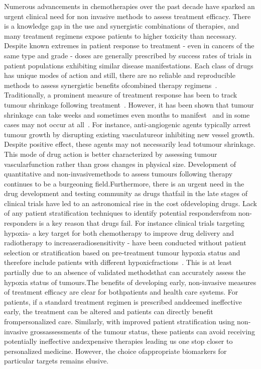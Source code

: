 Numerous advancements in chemotherapies over the past decade have sparked an urgent clinical need for non invasive methods to assess treatment efficacy.
There is a knowledge gap in the use and synergistic combinations of therapies, and many treatment regimens expose patients to higher toxicity than necessary.
Despite known extremes in patient response to treatment - even in cancers of the same type and grade - doses are generally prescribed by success rates of trials in patient populations exhibiting similar disease manifestations.
Each class of drugs has unique modes of action and still, there are no reliable and reproducible methods to assess synergistic benefits ofcombined therapy regimens~\cite{Zhang:2008vi}.
Traditionally, a prominent measure of treatment response has been to track tumour shrinkage following treatment~\cite{Tuma:2006hx}.
However, it has been shown that tumour shrinkage can take weeks and sometimes even months to manifest~\cite{Brindle:2008tb} and in some cases may not occur at all~\cite{Kitzen:2008un}.
For instance, anti-angiogenic agents typically arrest tumour growth by disrupting existing vasculatureor inhibiting new vessel growth.
Despite positive effect, these agents may not necessarily lead totumour shrinkage.
This mode of drug action is better characterized by assessing tumour vascularfunction rather than gross changes in physical size.
Development of quantitative and non-invasivemethods to assess tumours following therapy continues to be a burgeoning field.Furthermore, there is an urgent need in the drug development and testing community as drugs thatfail in the late stages of clinical trials have led to an astronomical rise in the cost ofdeveloping drugs.
Lack of any patient stratification techniques to identify potential respondersfrom non-responders is a key reason that drugs fail.
For instance clinical trials targeting hypoxia- a key target for both chemotherapy to improve drug delivery and radiotherapy to increaseradiosensitivity - have been conducted without patient selection or stratification based on pre-treatment tumour hypoxia status and therefore include patients with different hypoxicfractions~\cite{Overgaard:2011ji}.
This is at least partially due to an absence of validated methodsthat can accurately assess the hypoxia status of tumours.The benefits of developing early, non-invasive measures of treatment efficacy are clear for bothpatients and health care systems.
For patients, if a standard treatment regimen is prescribed anddeemed ineffective early, the treatment can be altered and patients can directly benefit frompersonalized care.
Similarly, with improved patient stratification using non-invasive grossassessments of the tumour status, these patients can avoid receiving potentially ineffective andexpensive therapies leading us one stop closer to personalized medicine.
However, the choice ofappropriate biomarkers for particular targets remains elusive.	

